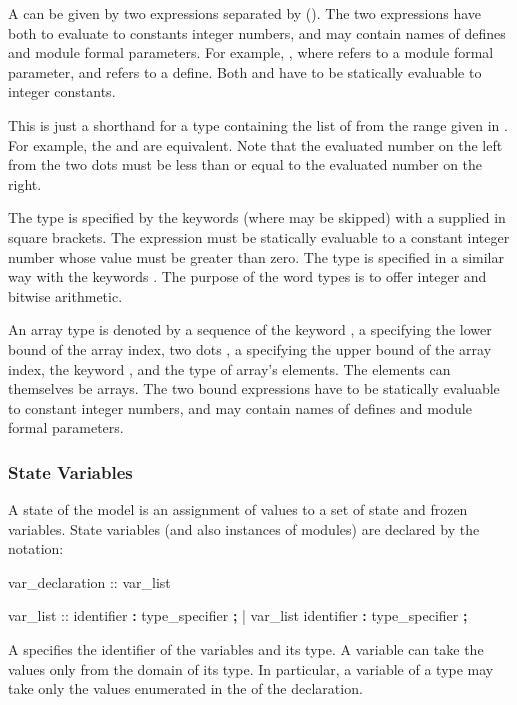 A  can be given by two expressions
separated by  (). The two
expressions have both to evaluate to constants integer numbers, and
may contain names of defines and module formal parameters. For example,
, where  refers to a module formal 
parameter, and  refers to a define. Both  and 
 have to be statically evaluable to integer constants.

This is just a shorthand for a \Enum type containing the list
of  from the range given in .
%
For example, the   and
 are equivalent. 
%
Note that the evaluated number on the left from the two dots must
be less than or equal to the evaluated number on the right.

The \UWord type is specified by the keywords 
(where  may be skipped) with a  
supplied in square brackets.
%
The expression must be statically evaluable to a constant integer
number whose value must be greater than zero. 
%
The \SWord type is specified in a similar way with the keywords
.
%
The purpose of the word types is to offer integer and bitwise
arithmetic.


An array type is denoted by a sequence of the keyword
, a  specifying the lower
bound of the array index, two dots , a
 specifying the upper bound of the array
index, the keyword , and the type of array's
elements. The elements can themselves be arrays. The two bound
expressions have to be statically evaluable to constant integer
numbers, and may contain names of defines and module formal
parameters.


\subsubsection{State Variables}
\label{State Variables}
%
A state of the model is an assignment of values to a set of state
and frozen variables. 
%
State variables (and also instances of modules) are declared by the
notation:
%
\begin{Grammar}
var_declaration ::  var_list

var_list :: identifier \textbf{:} type_specifier \textbf{;}
          | var_list identifier \textbf{:} type_specifier \textbf{;}
\end{Grammar}
%
A  specifies the identifier of the
variables and its type. 
%
A variable can take the values only from the domain of its type. In
particular, a variable of a \Enum type may take only the values
enumerated in the  of the declaration.

